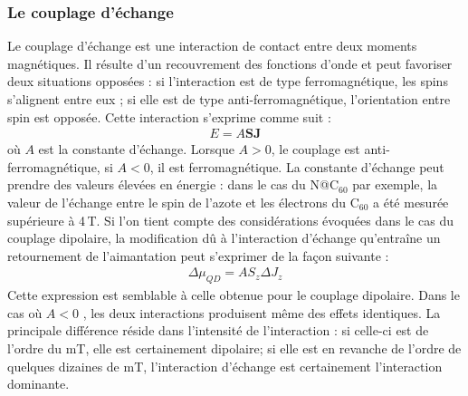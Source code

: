 \subsubsection{Le couplage d'échange}
Le couplage d'échange est une interaction de contact entre deux moments magnétiques. Il résulte d'un recouvrement des fonctions d'onde et peut favoriser deux situations opposées : si l'interaction est de type ferromagnétique, les spins s'alignent entre eux ; si elle est de type anti-ferromagnétique, l'orientation entre spin est opposée. Cette interaction s'exprime comme suit :
\begin{eqnarray}
E = A\mathbf{SJ} \nonumber
\end{eqnarray}
où $A$ est la constante d'échange. Lorsque $A>0$, le couplage est anti-ferromagnétique, si $A<0$, il est ferromagnétique. La constante d'échange peut prendre des valeurs élevées en énergie : dans le cas du N@C$_{60}$ par exemple, la valeur de l'échange entre le spin de l'azote et les électrons du C$_{60}$ a été mesurée supérieure à 4\,T. Si l'on tient compte des considérations évoquées dans le cas du couplage dipolaire, la modification d\^u à l'interaction d'échange qu’entraîne un retournement de l'aimantation peut s'exprimer de la façon suivante :
\begin{eqnarray}
\Delta \mu_{QD} = AS_z\Delta J_z\nonumber
\end{eqnarray}
Cette expression est semblable à celle obtenue pour le couplage dipolaire. Dans le cas où $A<0$ , les deux interactions produisent même des effets identiques. La principale différence réside dans l'intensité de l'interaction : si celle-ci est de l'ordre du mT, elle est certainement dipolaire; si elle est en revanche de l'ordre de quelques dizaines de mT, l'interaction d'échange est certainement l'interaction dominante.


